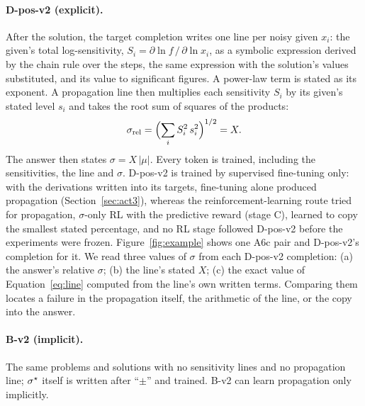 \paragraph{D-pos-v2 (explicit).}
After the solution, the target completion writes one line per noisy given $x_i$:
the given's total log-sensitivity, $S_i = \partial \ln f \,/\, \partial \ln x_i$, as a symbolic expression derived by
the chain rule over the steps, the same expression with the solution's values substituted, and its value to
 significant figures.
A power-law term is stated as its exponent.
A propagation line then multiplies each sensitivity $S_i$ by its given's stated level $s_i$ and takes the root sum of
squares of the products:
\begin{equation}
  \sigma_{\text{rel}} = \Bigl(\sum_i S_i^2\, s_i^2\Bigr)^{1/2} = X .
  \label{eq:line}
\end{equation}
The answer then states $\sigma = X\,|\mu|$.
Every token is trained, including the sensitivities, the line and $\sigma$.
D-pos-v2 is trained by supervised fine-tuning only: with the derivations written into its targets, fine-tuning alone
produced propagation (Section~\ref{sec:act3}), whereas the reinforcement-learning route tried for propagation, $\sigma$-only
RL with the predictive reward (stage C), learned to copy the smallest stated percentage, and no RL stage followed
D-pos-v2 before the experiments were frozen.
Figure~\ref{fig:example} shows one A6c pair and D-pos-v2's completion for it.
We read three values of $\sigma$ from each D-pos-v2 completion:
(a) the answer's relative $\sigma$;
(b) the line's stated $X$;
(c) the exact value of Equation~\eqref{eq:line} computed from the line's own written terms.
Comparing them locates a failure in the propagation itself, the arithmetic of the line, or the copy into the answer.

\paragraph{B-v2 (implicit).}
The same problems and solutions with no sensitivity lines and no propagation line; $\sigma^{\star}$ itself is written after
``$\pm$'' and trained.
B-v2 can learn propagation only implicitly.

